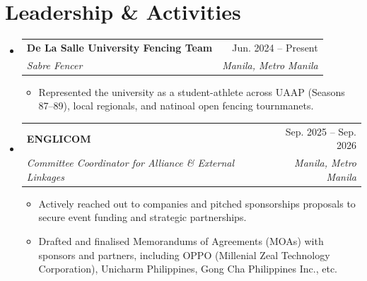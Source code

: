 \documentclass[a4paper,11pt]{article}
\makeatletter
\newcommand{\resumeItem}[1]{
  \item\small{
    {#1 \vspace{-2pt}}
  }
}
\newcommand{\resumeSubheading}[4]{
  \vspace{-2pt}\item
    \begin{tabular*}{0.97\textwidth}[t]{l@{\extracolsep{\fill}}r}
      \textbf{#1} & #2 \\
      \textit{\small#3} & \textit{\small #4} \\
    \end{tabular*}\vspace{-7pt}
}
\newcommand{\resumeSubHeadingListStart}{\begin{itemize}[leftmargin=0.15in, label={}]}
\newcommand{\resumeSubHeadingListEnd}{\end{itemize}}
\newcommand{\resumeItemListStart}{\begin{itemize}}
\newcommand{\resumeItemListEnd}{\end{itemize}\vspace{-5pt}}
\makeatother
\begin{document}
 
\section{Leadership \& Activities}
    \resumeSubHeadingListStart

    \resumeSubheading
      {De La Salle University Fencing Team}{Jun. 2024 -- Present}
      {Sabre Fencer}{Manila, Metro Manila}
      \resumeItemListStart
        \resumeItem{Represented the university as a student-athlete across UAAP (Seasons 87--89), local regionals, and natinoal open fencing tournmanets.}
      \resumeItemListEnd

    \resumeSubheading
      {ENGLICOM}{Sep. 2025 -- Sep. 2026}
      {Committee Coordinator for Alliance \& External Linkages}{Manila, Metro Manila}
      \resumeItemListStart
        \resumeItem{Actively reached out to companies and pitched sponsorships proposals to secure event funding and strategic partnerships.}
        \resumeItem{Drafted and finalised Memorandums of Agreements (MOAs) with sponsors and partners, including OPPO (Millenial Zeal Technology Corporation), Unicharm Philippines, Gong Cha Philippines Inc., etc.}
      \resumeItemListEnd
      
    \resumeSubHeadingListEnd


\end{document}
